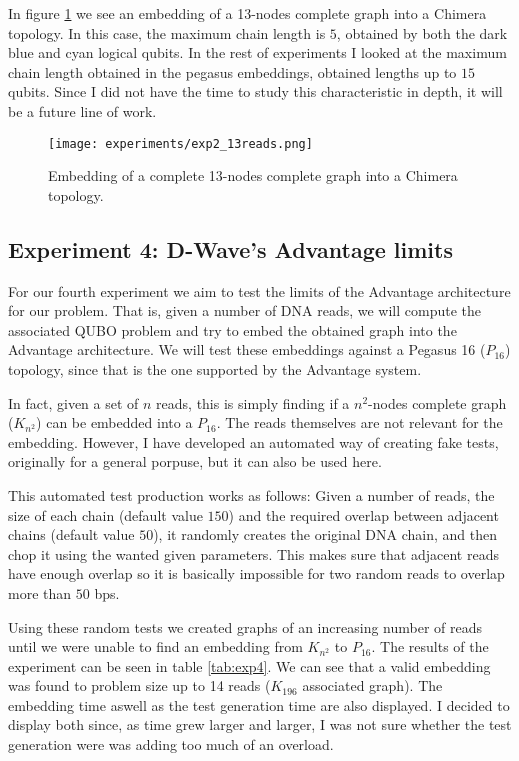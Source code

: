 In figure \ref{fig:exp2_13reads} we see an embedding of a 13-nodes complete graph into a Chimera topology. In this case, the maximum chain length is $5$, obtained by both the dark blue and cyan logical qubits. In the rest of experiments I looked at the maximum chain length obtained in the pegasus embeddings, obtained lengths up to $15$ qubits. Since I did not have the time to study this characteristic in depth, it will be a future line of work.

\begin{figure}[h]
	\texttt{[image: experiments/exp2\_13reads.png]}
	\centering
	\caption{Embedding of a complete 13-nodes complete graph into a Chimera topology.}
	\label{fig:exp2_13reads}
\end{figure}


\FloatBarrier
\subsection{Experiment 4: D-Wave's Advantage limits}


For our fourth experiment we aim to test the limits of the Advantage architecture for our problem. That is, given a number of DNA reads, we will compute the associated QUBO problem and try to embed the obtained graph into the Advantage architecture. We will test these embeddings against a Pegasus 16 ($P_{16}$) topology, since that is the one supported by the Advantage system.

In fact, given a set of $n$ reads, this is simply finding if a $n^2$-nodes complete graph ($K_{n^2}$) can be embedded into a $P_{16}$. The reads themselves are not relevant for the embedding. However, I have developed an automated  way of creating fake tests, originally for a general porpuse, but it can also be used here.

This automated test production works as follows: Given a number of reads, the size of each chain (default value $150$) and the required overlap between adjacent chains (default value $50$), it randomly creates the original DNA chain, and then chop it using the wanted given parameters. This makes sure that adjacent reads have enough overlap so it is basically impossible for two random reads to overlap more than $50$ bps.

Using these random tests we created graphs of an increasing number of reads until we were unable to find an embedding from $K_{n^2}$ to $P_{16}$. The results of the experiment can be seen in table \ref{tab:exp4}. We can see that a valid embedding was found to problem size up to 14 reads ($K_{196}$ associated graph). The embedding time aswell as the test generation time are also displayed. I decided to display both since, as time grew larger and larger, I was not sure whether the test generation were was adding too much of an overload.

